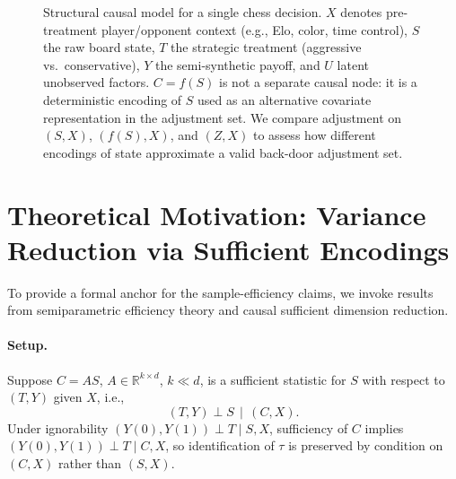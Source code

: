 \documentclass{article}
\begin{document}
\begin{figure}[t]
\centering
{}
\caption{Structural causal model for a single chess decision.
$X$ denotes pre-treatment player/opponent context (e.g., Elo, color, time control),
$S$ the raw board state, $T$ the strategic treatment (aggressive vs.\ conservative),
$Y$ the semi-synthetic payoff, and $U$ latent unobserved factors.
$C = f(S)$ is not a separate causal node: it is a deterministic encoding of $S$
used as an alternative covariate representation in the adjustment set.
We compare adjustment on $(S, X)$, $(f(S), X)$, and $(Z, X)$ to assess
how different encodings of state approximate a valid back-door adjustment set.}
\label{fig:scm_chess}
\end{figure}

\section{Theoretical Motivation: Variance Reduction via Sufficient Encodings}
\label{sec:theory}

To provide a formal anchor for the sample-efficiency claims, we invoke results from
semiparametric efficiency theory and causal sufficient dimension
reduction.\cite{hahn1998role,ma2012semiparametric,nabi2022causal}

\paragraph{Setup.} Suppose $C = AS$, $A \in \mathbb{R}^{k \times d}$, $k \ll d$,
is a sufficient statistic for $S$ with respect to $(T, Y)$ given $X$, i.e.,
\[
(T, Y) \perp S \,\mid\, (C, X).
\]
Under ignorability $(Y(0), Y(1)) \perp T \mid S, X$, sufficiency of $C$ implies
$(Y(0), Y(1)) \perp T \mid C, X$, so identification of $\tau$ is preserved by
condition on $(C, X)$ rather than $(S, X)$.
\end{document}
